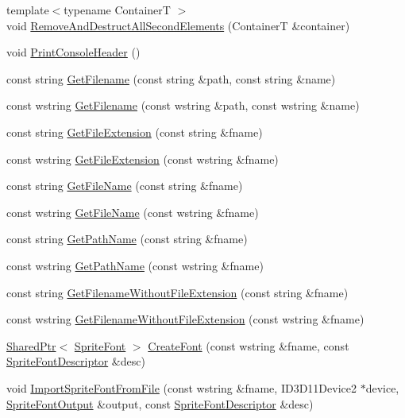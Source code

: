 \begin{DoxyCompactItemize}
\item 
{\footnotesize template$<$typename ContainerT $>$ }\\void \hyperlink{namespacemage_aa3db059e4b0563e46cdf3a3a369c3288}{Remove\+And\+Destruct\+All\+Second\+Elements} (ContainerT \&container)
\item 
void \hyperlink{namespacemage_a064756443bd8a1af6974f22c81d29ed0}{Print\+Console\+Header} ()
\item 
const string \hyperlink{namespacemage_aa85467b1af6c9f14e93178cbfd6ca022}{Get\+Filename} (const string \&path, const string \&name)
\item 
const wstring \hyperlink{namespacemage_a42580a2b02794193143aea32e3c815b5}{Get\+Filename} (const wstring \&path, const wstring \&name)
\item 
const string \hyperlink{namespacemage_a4da638506a9dda4f16c41a1a00c0d0e1}{Get\+File\+Extension} (const string \&fname)
\item 
const wstring \hyperlink{namespacemage_a2818c96634f4c8d49dcc4144395b24ef}{Get\+File\+Extension} (const wstring \&fname)
\item 
const string \hyperlink{namespacemage_a167010e334287f9369b15564802a770b}{Get\+File\+Name} (const string \&fname)
\item 
const wstring \hyperlink{namespacemage_ac643523ad89ca58419a2cac93912693b}{Get\+File\+Name} (const wstring \&fname)
\item 
const string \hyperlink{namespacemage_ab3642c6ef6cf94a62fb37b40c3c2f57e}{Get\+Path\+Name} (const string \&fname)
\item 
const wstring \hyperlink{namespacemage_ad23faa6d1854d389eb37fbdeefe97361}{Get\+Path\+Name} (const wstring \&fname)
\item 
const string \hyperlink{namespacemage_ab8841cbab507ef81edb00278110553ad}{Get\+Filename\+Without\+File\+Extension} (const string \&fname)
\item 
const wstring \hyperlink{namespacemage_aac01c0fba57d6737fcf32155748e95b0}{Get\+Filename\+Without\+File\+Extension} (const wstring \&fname)
\item 
\hyperlink{namespacemage_a1e01ae66713838a7a67d30e44c67703e}{Shared\+Ptr}$<$ \hyperlink{classmage_1_1_sprite_font}{Sprite\+Font} $>$ \hyperlink{namespacemage_ac93dae3a8755fa1e1c9be6c8aa0e07d2}{Create\+Font} (const wstring \&fname, const \hyperlink{structmage_1_1_sprite_font_descriptor}{Sprite\+Font\+Descriptor} \&desc)
\item 
void \hyperlink{namespacemage_aac88563417bcd178423aec61ca687a74}{Import\+Sprite\+Font\+From\+File} (const wstring \&fname, I\+D3\+D11\+Device2 $\ast$device, \hyperlink{structmage_1_1_sprite_font_output}{Sprite\+Font\+Output} \&output, const \hyperlink{structmage_1_1_sprite_font_descriptor}{Sprite\+Font\+Descriptor} \&desc)

\end{DoxyCompactItemize}
